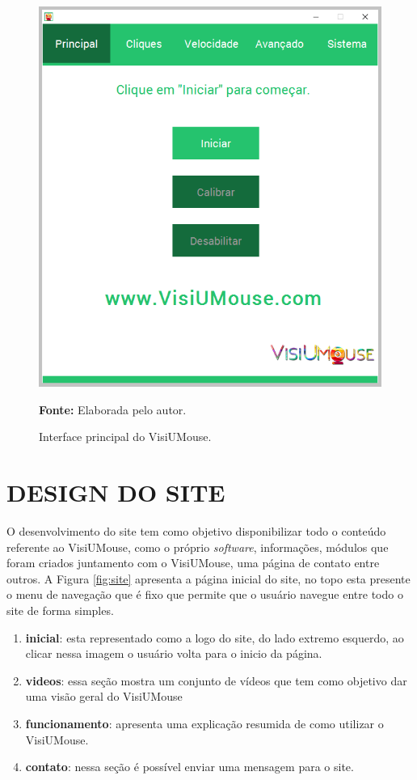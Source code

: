 \begin{figure}[htbp]
\caption{Interface principal do VisiUMouse.} 
\centering \includegraphics[scale=.5]{img/visiumouse-tela-principal-v216.png}

\textbf{Fonte:} Elaborada pelo autor.
\label{fig:interface-tecnologia}
\end{figure}

\section{DESIGN DO SITE}\label{Sub:site}

O desenvolvimento do site tem como objetivo disponibilizar todo o conteúdo referente ao VisiUMouse, como o próprio \textit{software}, informações, módulos que foram criados juntamento com o VisiUMouse, uma página de contato entre outros. A Figura \ref{fig:site} apresenta a página inicial do site, no topo esta presente o menu de navegação que é fixo que permite que o usuário navegue entre todo o site de forma simples.

\begin{enumerate}
\item \textbf{inicial}: esta representado como a logo do site, do lado extremo esquerdo, ao clicar nessa imagem o usuário volta para o inicio da página.
\item \textbf{videos}: essa seção mostra um conjunto de vídeos que tem como objetivo dar uma visão geral do VisiUMouse
\item \textbf{funcionamento}: apresenta uma explicação resumida de como utilizar o VisiUMouse.
\item \textbf{contato}: nessa seção é possível enviar uma mensagem para o site.
\end{enumerate}


